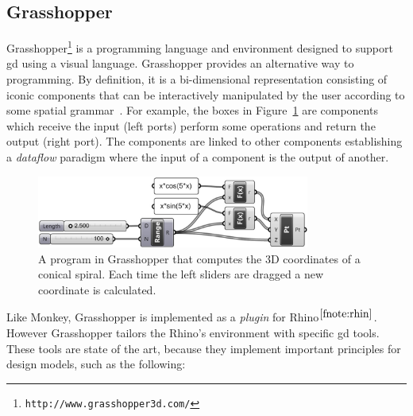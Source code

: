 \subsection{Grasshopper}
\label{subsec:grasshopper}
Grasshopper\footnote{\texttt{http://www.grasshopper3d.com/}} is a programming language and environment designed to support \gls{gd} using a visual language. Grasshopper provides an alternative way to programming. By definition, it is a bi-dimensional representation consisting of iconic components that can be interactively manipulated by the user according to some spatial grammar~\citep{myers1990taxonomies}. For example, the boxes in Figure~\ref{fig:grass} are components which receive the input (left ports) perform some operations and return the output (right port). The components are linked to other components establishing a \textit{dataflow} paradigm where the input of a component is the output of another.

\begin{figure}[!htbp]
  \centering
  \includegraphics[width=0.8\textwidth]{images/grasshopper}
    \caption{A program in Grasshopper that computes the 3D coordinates of a conical spiral. Each time the left sliders are dragged a new coordinate is calculated.}
  \label{fig:grass}
\end{figure}

Like Monkey, Grasshopper is implemented as a \textit{plugin} for Rhino$^{\ref{fnote:rhin}}$. However Grasshopper tailors the Rhino's environment with specific \gls{gd} tools. These tools are state of the art, because they implement important principles for design models, such as the following:

